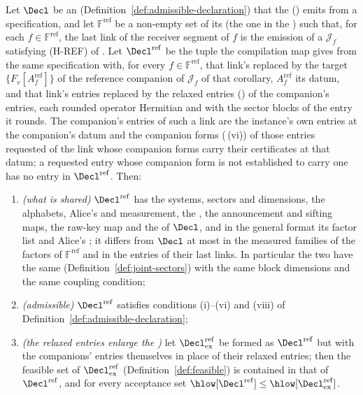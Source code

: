 \begin{proposition}\label{prop:reference-companion}
Let $\Decl$ be an 
(Definition~\ref{def:admissible-declaration}) that the 
() emits from a specification, and let
$\mathbb{F}^{\mathrm{ref}}$ be a non-empty set of its
 (the one  in
the ) such that, for each $f\in\mathbb{F}^{\mathrm{ref}}$,
the last link of the receiver segment of $f$ is the emission of a
 $\mathcal{J}_f$ satisfying (H-REF) of
. Let $\Decl^{\mathrm{ref}}$ be the
tuple the compilation map gives from the same specification with, for every
$f\in\mathbb{F}^{\mathrm{ref}}$, that link's  replaced by
the target $\{F_v[A^{\mathrm{ref}}_f]\}$ of the reference companion of
$\mathcal{J}_f$ of that corollary, $A^{\mathrm{ref}}_f$ its datum, and that
link's entries replaced by the relaxed entries
() of the companion's entries, each
rounded operator Hermitian and with the sector blocks of the entry it rounds.
The companion's entries of such a link are the instance's own entries at the
companion's datum and the companion forms
(\,(vi)) of those entries requested
of the link whose companion forms carry their certificates at that datum; a
requested entry whose companion form is not established to carry one has no
entry in $\Decl^{\mathrm{ref}}$. Then:
\begin{enumerate}[label=(\roman*),leftmargin=2.4em]
\item \emph{(what is shared)} $\Decl^{\mathrm{ref}}$ has the systems,
  sectors and dimensions, the alphabets, Alice's  and
  measurement, the , the announcement and sifting maps, the
  raw-key map and the  of $\Decl$, and in the general format its
  factor list and Alice's ; it differs from
  $\Decl$ at most in the measured families of the factors of
  $\mathbb{F}^{\mathrm{ref}}$ and in the entries of their last links. In
  particular the two have the same 
  (Definition~\ref{def:joint-sectors}) with the same block dimensions and the
  same coupling condition;
\item \emph{(admissible)} $\Decl^{\mathrm{ref}}$ satisfies conditions
  (i)--(vi) and (viii) of Definition~\ref{def:admissible-declaration};
\item \emph{(the relaxed entries enlarge the )} let
  $\Decl^{\mathrm{ref}}_{\mathrm{ex}}$ be formed as $\Decl^{\mathrm{ref}}$
  but with the companions' entries themselves in place of their relaxed
  entries; then the feasible set of $\Decl^{\mathrm{ref}}_{\mathrm{ex}}$
  (Definition~\ref{def:feasible}) is contained in that of
  $\Decl^{\mathrm{ref}}$, and for every acceptance set
  $\hlow[\Decl^{\mathrm{ref}}]\le\hlow[\Decl^{\mathrm{ref}}_{\mathrm{ex}}]$.
\end{enumerate}
\end{proposition}

